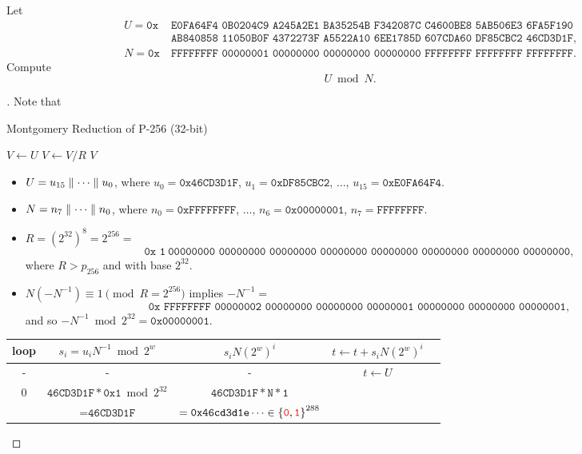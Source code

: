 \newpage
\begin{example}
Let \begin{align*}
U = \texttt{0x}&\ \texttt{E0FA64F4 0B0204C9 A245A2E1 BA35254B F342087C C4600BE8 5AB506E3 6FA5F190}\\
&\ \texttt{AB840858 11050B0F 4372273F A5522A10 6EE1785D 607CDA60 DF85CBC2 46CD3D1F},\\
N = \texttt{0x}&\ \texttt{FFFFFFFF 00000001 00000000 00000000 00000000 FFFFFFFF FFFFFFFF FFFFFFFF}.
\end{align*}
Compute \[
U\bmod N.
\]\begin{proof}[\sol]
Note that\\ 
\begin{algorithm}[h!]
	\DontPrintSemicolon
	\caption{Montgomery Reduction of P-256 (32-bit)}
	\BlankLine
	\BlankLine
	$V\gets U$
	$V\gets V / R$\;
	\Return $V$\;
\end{algorithm}
\begin{itemize}
	\item $U=u_{15}\parallel\cdots\parallel u_0$, where $u_0=\texttt{0x46CD3D1F}$, $u_1=\texttt{0xDF85CBC2}$, $\dots$, $u_{15}=\texttt{0xE0FA64F4}$.
	\item $N=n_{7}\parallel\cdots\parallel n_0$, where $n_0=\texttt{0xFFFFFFFF}$, $\dots$, $n_{6}=\texttt{0x00000001}$, $n_{7}=\texttt{FFFFFFFF}$.
	\item $R=(2^{32})^8=2^{256}=$ \[
	\texttt{0x 1}\ \texttt{00000000 00000000 00000000 00000000 00000000 00000000 00000000 00000000},
	\] where $R>p_{256}$ and with base $2^{32}$.
	\item $N(-N^{-1})\equiv 1\pmod{R=2^{256}}$ implies $-N^{-1}=$ \[
	\texttt{0x FFFFFFFF 00000002 00000000 00000000 00000001 00000000 00000000 00000001},
	\] and so
	$-N^{-1}\bmod 2^{32}=\texttt{0x00000001}$.
\end{itemize}
\begin{table}[h!]\centering
\begin{tabular}{c||c|c|cc}
\toprule[1.2pt]
loop & $s_i=u_iN^{-1}\bmod 2^w$ & $s_iN(2^{w})^i$ & $t\gets t+s_iN(2^w)^i$\\
\midrule
- & - & - & $t\gets U$\\
\hline
\multirow{2}{*}{0} & $\texttt{46CD3D1F} * \texttt{0x1}\bmod 2^{32}$ & $\texttt{46CD3D1F} *\texttt{N}*\texttt{1}$ \\
& $=\texttt{46CD3D1F}$ & $=\texttt{0x46cd3d1e}\cdots\in\set{\textcolor{red}{\texttt{0}},\textcolor{red}{\texttt{1}}}^{288}$\\
  \bottomrule[1.2pt]
\end{tabular}
\end{table}
\end{proof}
\end{example}


